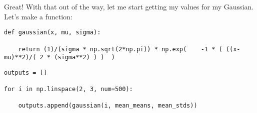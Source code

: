 \documentclass[12pt]{article}
\begin{document}
Great! With that out of the way, let me start getting my values for my Gaussian. Let's make a function:


\begin{lstlisting}[frame=shadowbox]
def gaussian(x, mu, sigma):

    return (1)/(sigma * np.sqrt(2*np.pi)) * np.exp(    -1 * ( ((x-mu)**2)/( 2 * (sigma**2) ) )  )
\end{lstlisting}


\begin{lstlisting}[frame=shadowbox]
outputs = []

for i in np.linspace(2, 3, num=500):

    outputs.append(gaussian(i, mean_means, mean_stds))
\end{lstlisting}


\begin{lstlisting}[frame=shadowbox]

\end{lstlisting}


\end{document}
